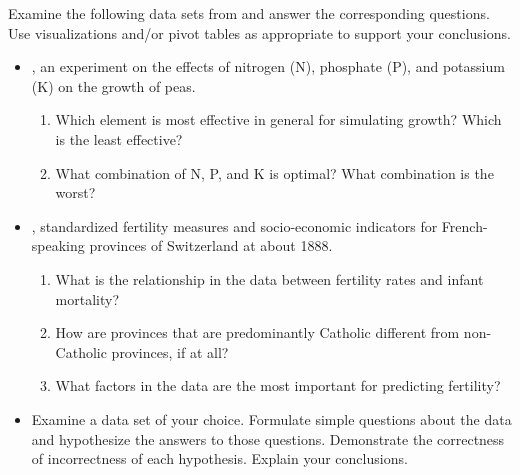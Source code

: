 Examine the following data sets from  and answer the corresponding questions.
Use visualizations and/or pivot tables as appropriate to support your conclusions.
\begin{itemize}
    \item {}, an experiment on the effects of nitrogen (N), phosphate (P), and potassium (K) on the growth of peas.
    \begin{enumerate}
        \item Which element is most effective in general for simulating growth?
        Which is the least effective?
        \item What combination of N, P, and K is optimal? What combination is the worst?
    \end{enumerate}
    \item {}, standardized fertility measures and socio-economic indicators for French-speaking provinces of Switzerland at about 1888.
    \begin{enumerate}
        \item What is the relationship in the data between fertility rates and infant mortality?
        \item How are provinces that are predominantly Catholic different from non-Catholic provinces, if at all?
        \item What factors in the data are the most important for predicting fertility?
    \end{enumerate}
    \item Examine a data set of your choice.
    Formulate simple questions about the data and hypothesize the answers to those questions.
    Demonstrate the correctness of incorrectness of each hypothesis.
    Explain your conclusions.
\end{itemize}
